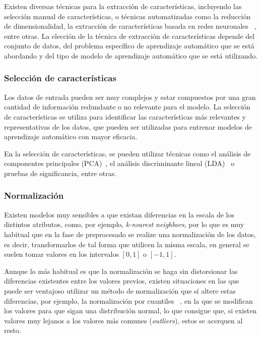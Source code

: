 Existen diversas técnicas para la extracción de características, incluyendo las
selección manual de características, o técnicas automatizadas como la reducción
de dimensionalidad, la extracción de características basada en redes neuronales
~\cite{intrator1991feature}, entre otras. La elección de la técnica de extracción
de características depende del conjunto de datos, del problema específico de
aprendizaje automático que se está abordando y del tipo de modelo de aprendizaje
automático que se está utilizando.

\subsubsection{Selección de características}

Los datos de entrada pueden ser muy complejos y estar compuestos por una gran
cantidad de información redundante o no relevante para el modelo. La selección
de características se utiliza para identificar  las características más
relevantes y representativas de los datos, que pueden ser utilizadas para
entrenar modelos de aprendizaje automático con mayor eficacia.

En la selección de características, se pueden utilizar técnicas como el análisis
de componentes principales (PCA)~\cite{mackiewicz1993principal}, el análisis
discriminante lineal (LDA)~\cite{xanthopoulos2013linear} o pruebas de
significancia, entre otras.

\subsubsection{Normalización}

Existen modelos muy sensibles a que existan diferencias en la escala de los
distintos atributos, como, por ejemplo, \textit{k-nearest neighbors}, por lo que
es muy habitual que en la fase de preprocesado se realize una normalización de
los datos, es decir, transformarlos de tal forma que utilicen la misma escala,
en general se suelen tomar valores en los intervalos $[0, 1]$ o $[-1, 1]$.

Aunque lo más habitual es que la normalización se haga sin distorsionar las
diferencias existentes entre los valores previos, existen situaciones en las que
puede ser ventajoso utilizar un método de normalización que sí altere estas
diferencias, por ejemplo, la normalización por cuantiles
~\cite{enwiki:1138433182}, en la que se modifican los valores para que sigan una
distribución normal, lo que consigue que, si existen valores muy lejanos a los
valores más comunes (\textit{outliers}), estos se acerquen al resto. 


